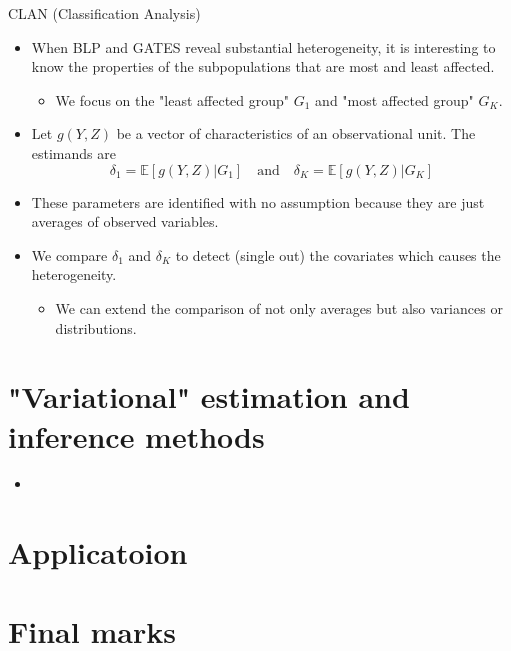 \documentclass[xcolor=svgnames,aspectratio=169]{beamer}
\newcommand{\E}{\mathbb{E}}
\begin{document}
\begin{frame}{CLAN (Classification Analysis)}
    \begin{itemize}
        \item When BLP and GATES reveal substantial heterogeneity, it is interesting to know \alert{the properties of the subpopulations} that are most and least affected.
        \begin{itemize}
            \item We focus on the "least affected group" $G_1$ and "most affected group" $G_K$.
        \end{itemize}
        \item Let $g(Y,Z)$ be a vector of characteristics of an observational unit. The estimands are 
        \[
        \delta_1=\E[g(Y,Z)|G_1]\quad \text{and}\quad\delta_K=\E[g(Y,Z)|G_K]
        \]
        \item These parameters are identified with no assumption because they are just averages of observed variables.
        \item We compare $\delta_1$ and $\delta_K$ to detect (single out) the covariates which causes the heterogeneity.
        \begin{itemize}
            \item We can extend the comparison of not only averages but also variances or distributions.
        \end{itemize}
    \end{itemize}
\end{frame}

\section{"Variational" estimation and inference methods}

\begin{frame}
    \begin{itemize}
        \item 
    \end{itemize}
\end{frame}

\section{Applicatoion}

\section{Final marks}
\end{document}
